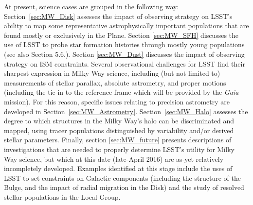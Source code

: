 At present, science cases are grouped in the following way:
Section~\ref{sec:MW_Disk} assesses the impact of observing strategy on
LSST's ability to map some representative astrophysically important
populations that are found mostly or exclusively in the Plane.  Section
\ref{sec:MW_SFH} discusses the use of LSST to probe star formation
histories through mostly young populations (see also Section 5.6.).
Section \ref{sec:MW_Dust} discusses the impact of observing strategy on
ISM constraints. Several observational challenges for LSST find their
sharpest expression in Milky Way science, including (but not limited to)
measurements of stellar parallax, absolute astrometry, and proper
motions (including the tie-in to the reference frame which will be
provided by the \textit{Gaia} mission). For this reason, specific issues
relating to precision astrometry are developed in
Section~\ref{sec:MW_Astrometry}. Section~\ref{sec:MW_Halo} assesses the
degree to which structures in the Milky Way's halo can be discriminated
and mapped, using tracer populations distinguished by variability and/or
derived stellar parameters. Finally, section \ref{sec:MW_future}
presents descriptions of investigations that are needed to properly
determine LSST's utility for Milky Way science, but which at this date
(late-April 2016) are as-yet relatively incompletely developed. Examples
identified at this stage include the uses of LSST to set constraints on
Galactic components (including the structure of the Bulge, and the
impact of radial migration in the Disk) and the study of resolved
stellar populations in the Local Group.

%

%

